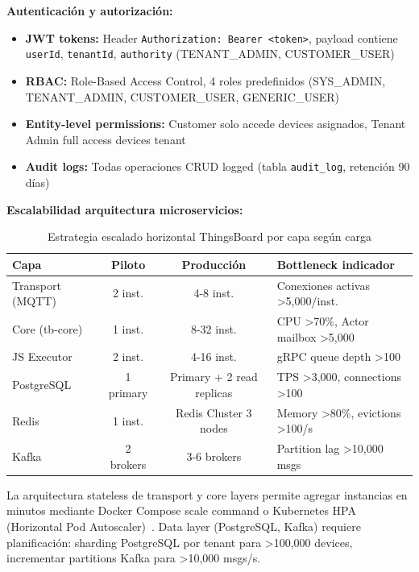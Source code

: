 \textbf{Autenticación y autorización:}

\begin{itemize}
    \item \textbf{JWT tokens:} Header \texttt{Authorization: Bearer <token>}, payload contiene \texttt{userId}, \texttt{tenantId}, \texttt{authority} (TENANT\_ADMIN, CUSTOMER\_USER)
    \item \textbf{RBAC:} Role-Based Access Control, 4 roles predefinidos (SYS\_ADMIN, TENANT\_ADMIN, CUSTOMER\_USER, GENERIC\_USER)
    \item \textbf{Entity-level permissions:} Customer solo accede devices asignados, Tenant Admin full access devices tenant
    \item \textbf{Audit logs:} Todas operaciones CRUD logged (tabla \texttt{audit\_log}, retención 90 días)
\end{itemize}

\textbf{Escalabilidad arquitectura microservicios:}

\begin{table}[H]
\centering
\caption{Estrategia escalado horizontal ThingsBoard por capa según carga}
\label{tab:thingsboard-scaling}
\small
\begin{tabular}{|l|c|c|l|}
\hline
\textbf{Capa} & \textbf{Piloto} & \textbf{Producción} & \textbf{Bottleneck indicador} \\
\hline
Transport (MQTT) & 2 inst. & 4-8 inst. & Conexiones activas >5,000/inst. \\
Core (tb-core) & 1 inst. & 8-32 inst. & CPU >70\%, Actor mailbox >5,000 \\
JS Executor & 2 inst. & 4-16 inst. & gRPC queue depth >100 \\
PostgreSQL & 1 primary & Primary + 2 read replicas & TPS >3,000, connections >100 \\
Redis & 1 inst. & Redis Cluster 3 nodes & Memory >80\%, evictions >100/s \\
Kafka & 2 brokers & 3-6 brokers & Partition lag >10,000 msgs \\
\hline
\end{tabular}
\end{table}

La arquitectura stateless de transport y core layers permite agregar instancias en minutos mediante Docker Compose scale command o Kubernetes HPA (Horizontal Pod Autoscaler)~\cite{dockerComposeDocumentation2024,pereraScalableDataanalyticCapable2024}. Data layer (PostgreSQL, Kafka) requiere planificación: sharding PostgreSQL por tenant para >100,000 devices, incrementar partitions Kafka para >10,000 msgs/s.

